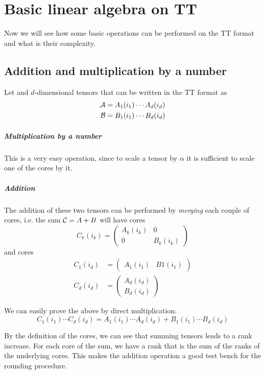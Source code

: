 \chapter{Basic linear algebra on TT}
Now we will see how some basic operations can be performed on the TT format and what is their complexity.

\section{Addition and multiplication by a number}
Let \A and \B $d$-dimensional tensors that can be written in the TT format as
\begin{equation*}
  \begin{split}
    \mathcal{A} &= A_1(i_1) \cdots A_d(i_d)\\
    \mathcal{B} &= B_1(i_1) \cdots B_d(i_d)
  \end{split}
\end{equation*}

\paragraph{Multiplication by a number}
This is a very easy operation, since to scale a tensor by $\alpha$ it is sufficient to scale one of the cores by it.

\paragraph{Addition}
The addition of these two tensors can be performed by \emph{merging} each couple of cores, i.e. the sum $\mathcal{C} = A + B$ will have  cores
\begin{equation*}
  C_k(i_k) = 
  \begin{pmatrix}
    A_k(i_k) & 0\\
    0 & B_k(i_k)
  \end{pmatrix}
\end{equation*}
and  cores
\begin{equation*}
  \begin{split}
    C_1(i_d) &= 
  \begin{pmatrix}
    A_1(i_1) & B1(i_1)
  \end{pmatrix}\\
  C_d(i_d) &= 
  \begin{pmatrix}
    A_d(i_d)\\
    B_d(i_d)
  \end{pmatrix}
  \end{split}
\end{equation*}

We can easily prove the above by direct multiplication:
\begin{equation*}
  C_1(i_1) \cdots C_d(i_d) = A_1(i_1) \cdots A_d(i_d) + B_1(i_1) \cdots B_d(i_d)
\end{equation*}

By the definition of the cores, we can see that summing tensors leads to a rank increase. For each core of the sum, we have a rank that is the sum of the ranks of the underlying cores. This makes the addition operation a good test bench for the rounding procedure.
